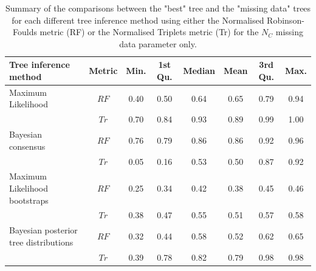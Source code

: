 \documentclass[12pt,letterpaper]{article}
\begin{document}
\begin{landscape}
\begin{table}[ht]
\caption{Summary of the comparisons between the "best" tree and the "missing data" trees for each different tree inference method using either the Normalised Robinson-Foulds metric (RF) or the Normalised Triplets metric (Tr) for the $N_{C}$ missing data parameter only.}
\label{Tab_Supp_summary_metric_MC}
\centering
\begin{tabular}{lccccccc}
  \hline
 Tree inference method & Metric & Min. & 1st Qu. & Median & Mean & 3rd Qu. & Max. \\ 
  \hline
  Maximum Likelihood                    & $RF$ & 0.40 & 0.50 & 0.64 & 0.65 & 0.79 & 0.94 \\ 
                                        & $Tr$ & 0.70 & 0.84 & 0.93 & 0.89 & 0.99 & 1.00 \\ 
  Bayesian consensus                    & $RF$ & 0.76 & 0.79 & 0.86 & 0.86 & 0.92 & 0.96 \\ 
                                        & $Tr$ & 0.05 & 0.16 & 0.53 & 0.50 & 0.87 & 0.92 \\ 
  Maximum Likelihood bootstraps         & $RF$ & 0.25 & 0.34 & 0.42 & 0.38 & 0.45 & 0.46 \\ 
                                        & $Tr$ & 0.38 & 0.47 & 0.55 & 0.51 & 0.57 & 0.58 \\ 
  Bayesian posterior tree distributions & $RF$ & 0.32 & 0.44 & 0.58 & 0.52 & 0.62 & 0.65 \\ 
                                        & $Tr$ & 0.39 & 0.78 & 0.82 & 0.79 & 0.98 & 0.98 \\ 
   \hline
\end{tabular}
\end{table}
\end{landscape}
\end{document}

